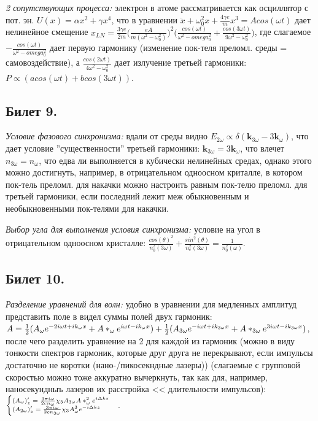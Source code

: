 \documentclass[a4paper,12pt]{article}
\theoremstyle{definition} %
\theoremstyle{definition} %
\theoremstyle{remark} %
\begin{document}
	\textit{2 сопутствующих процесса:} электрон в атоме рассматривается как осциллятор с пот. эн. $U(x)=\alpha x^{2} + \gamma x^{4}$, что в уравнении $\ddot{x} + \omega_{0}^{2} x + \frac{4\gamma e}{m} x^{3} = Acos(\omega t)$ дает нелинейное смещение $x_{LN} = \frac{3\gamma e}{2m} \Big( \frac{eA}{m(\omega^{2}-\omega_{0}^{2})} \Big)^{2} \Big( \frac{cos(\omega t)}{\omega^{2}-omega_{0}^{2}} + \frac{cos(3\omega t)}{9\omega^{2}-\omega_{0}^{2}} \Big)$, где слагаемое $-\frac{cos(\omega t)}{\omega^{2}-omega_{0}^{2}}$ дает первую гармонику (изменение пок-теля преломл. среды = самовоздействие), а $\frac{cos(2\omega t)}{4\omega^{2}-\omega_{0}^{2}}$ дает излучение третьей гармоники: $P \propto (acos(\omega t)+bcos(3\omega t))$.


\subsection{Билет 9.}


	\textit{Условие фазового синхронизма:} вдали от среды видно $E_{2\omega} \propto \delta(\mathbf{k}_{3\omega}-3\mathbf{k}_{\omega})$, что дает условие ''существенности'' третьей гармоники: $\mathbf{k}_{3\omega}=3\mathbf{k}_{\omega}$, что влечет $n_{3\omega}=n_{\omega}$, что едва ли выполняется в кубически нелинейных средах, однако этого можно достигнуть, например, в отрицательном одноосном криталле, в котором пок-тель преломл. для накачки можно настроить равным пок-телю преломл. для третьей гармоники, если последний лежит меж обыкновенным и необыкновенными пок-телями для накачки.


	\textit{Выбор угла для выполнения условия синхронизма:} условие на угол в отрицательном одноосном кристалле: $\frac{cos(\theta)^{2}}{n_{0}^{2}(3\omega)} + \frac{sin^{2}(\theta)}{n_{e}^{2}(3\omega)} = \frac{1}{n_{0}^{2}(\omega)}$.


\subsection{Билет 10.}


	\textit{Разделение уравнений для волн:} удобно в уравнении для медленных амплитуд представить поле в видел суммы полей двух гармоник: $A = \frac{1}{2} (A_{\omega}e^{-2i\omega t +i k_{\omega}x} + A*_{\omega}e^{i\omega t -i k_{\omega}x}) + \\ \frac{1}{2} (A_{3\omega}e^{-i\omega t +i k_{3\omega}x} + A*_{3\omega}e^{3i\omega t -i k_{3\omega}x})$, после чего разделить уравнение на 2 для каждой из гармоник (можно в виду тонкости спектров гармоник, которые друг друга не перекрывают, если импульсы достаточно не коротки (нано-/пикосекндные лазеры)) (слагаемые с групповой скоростью можно тоже аккуратно вычеркнуть, так как для, например, наносекундныъ лазеров их расстройка << длительности импульсов): $\scriptsize
	\begin{cases}
		(A_{\omega})'_{z}=\frac{3\pi i \omega}{2cn_{\omega}} \chi_{3} A_{3\omega}A*_{\omega}^{2} e^{i \Delta k z} \\
		(A_{2\omega})'_{z}=\frac{3\pi i \omega}{2cn_{3\omega}} \chi_{3} A_{\omega}^{3} e^{- i \Delta k z} 
	\end{cases}$.
\end{document}
